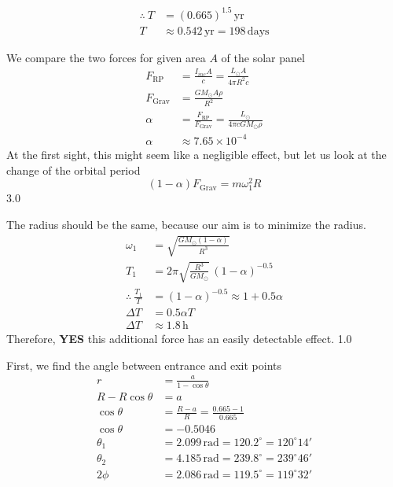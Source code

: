 \begin{description}
\begin{align*}
  \therefore\ T &= (0.665)^{1.5}\,\mathrm{yr}\\
  T &\approx 0.542\,\mathrm{yr} = 198\,\mathrm{days}
    \tag*{3.0}
  \end{align*}
\item[(g)] We compare the two forces for given area $A$ of the solar panel
  \begin{align*}
  F_{\mathrm{RP}} &= \frac{I_{inc}A}{c} = \frac{L_\odot A}{4\pi R^2 c}
    \tag*{2.0}\\
  F_{\mathrm{Grav}} &= \frac{GM_\odot A\rho}{R^2}
    \tag*{1.0}\\
  \alpha &= \frac{F_{\mathrm{RP}}}{F_{\mathrm{Grav}}}
    = \frac{L_\odot}{4\pi cGM_\odot\rho}\\
  \alpha &\approx 7.65\times10^{-4}
    \tag*{2.0}
  \end{align*}
  At the first sight, this might seem like a negligible effect, but let us
  look at the change of the orbital period
  \[ (1-\alpha)F_{\mathrm{Grav}} = m\omega_1^2 R \]
  \hfill 3.0

  The radius should be the same, because our aim is to minimize the radius.
  \begin{align*}
  \omega_1 &= \sqrt{\frac{GM_\odot(1-\alpha)}{R^3}}\\
  T_1 &= 2\pi\sqrt{\frac{R^3}{GM_\odot}}\,(1-\alpha)^{-0.5}
    \tag*{1.0}\\
  \therefore\ \frac{T_1}{T} &= (1-\alpha)^{-0.5} \approx 1 + 0.5\alpha\\
  \Delta T &= 0.5\alpha T\\
  \Delta T &\approx 1.8\,\mathrm{h}
    \tag*{3.0}
  \end{align*}
  Therefore, \textbf{YES} this additional force has an easily detectable
  effect. \hfill 1.0
\item[(h)] First, we find the angle between entrance and exit points
  \begin{align*}
  r &= \frac{a}{1-\cos\theta}\\
  R - R\cos\theta &= a\\
  \cos\theta &= \frac{R-a}{R} = \frac{0.665-1}{0.665}
    \tag*{1.0}\\
  \cos\theta &= -0.5046
    \tag*{1.0}\\
  \theta_1 &= 2.099\,\mathrm{rad} = 120.2^\circ = 120^\circ14'\\
  \theta_2 &= 4.185\,\mathrm{rad} = 239.8^\circ = 239^\circ46'\\
  2\phi &= 2.086\,\mathrm{rad} = 119.5^\circ = 119^\circ32'
    \tag*{3.0}
  \end{align*}


\end{description}
